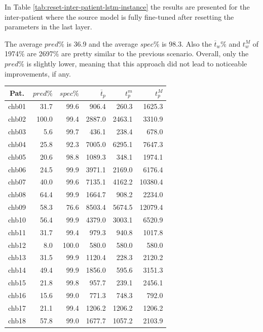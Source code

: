 In Table \ref{tab:reset-inter-patient-lstm-instance} the results are presented for the inter-patient where the source model is fully fine-tuned after resetting the parameters in the last layer.

The average $pred\%$ is 36.9 and the average $spec\%$ is 98.3. Also the $\overline{t}_w\%$ and $t_w^M$  of 1974\% are 2697\% are pretty similar to the previous scenario. Overall, only the $pred\%$ is slightly lower, meaning that this approach did not lead to noticeable improvements, if any.

\begin{table}[ht]
    \centering
    \begin{tabular}{c|rrrrr}
    Pat.  & $pred\%$ & $spec\%$ & $\overline{t}_p$   & $t_p^m$  & $t_p^M$   \\ \hline
    chb01   & 31.7   & 99.6   & 906.4   & 260.3   & 1625.3  \\
    chb02   & 100.0  & 99.4   & 2887.0  & 2463.1  & 3310.9  \\
    chb03   & 5.6    & 99.7   & 436.1   & 238.4   & 678.0   \\
    chb04   & 25.8   & 92.3   & 7005.0  & 6295.1  & 7647.3  \\
    chb05   & 20.6   & 98.8   & 1089.3  & 348.1   & 1974.1  \\
    chb06   & 24.5   & 99.9   & 3971.1  & 2169.0  & 6176.4  \\
    chb07   & 40.0   & 99.6   & 7135.1  & 4162.2  & 10380.4 \\
    chb08   & 64.4   & 99.9   & 1664.7  & 908.2   & 2234.0  \\
    chb09   & 58.3   & 76.6   & 8503.4  & 5674.5  & 12079.4 \\
    chb10   & 56.4   & 99.9   & 4379.0  & 3003.1  & 6520.9  \\
    chb11   & 31.7   & 99.4   & 979.3   & 940.8   & 1017.8  \\
    chb12   & 8.0    & 100.0  & 580.0   & 580.0   & 580.0   \\
    chb13   & 31.5   & 99.9   & 1120.4  & 228.3   & 2120.2  \\
    chb14   & 49.4   & 99.9   & 1856.0  & 595.6   & 3151.3  \\
    chb15   & 21.8   & 99.8   & 957.7   & 239.1   & 2456.1  \\
    chb16   & 15.6   & 99.0   & 771.3   & 748.3   & 792.0   \\
    chb17   & 21.1   & 99.4   & 1206.2  & 1206.2  & 1206.2  \\
    chb18   & 57.8   & 99.0   & 1677.7  & 1057.2  & 2103.9  \\

\end{tabular}
\end{table}
